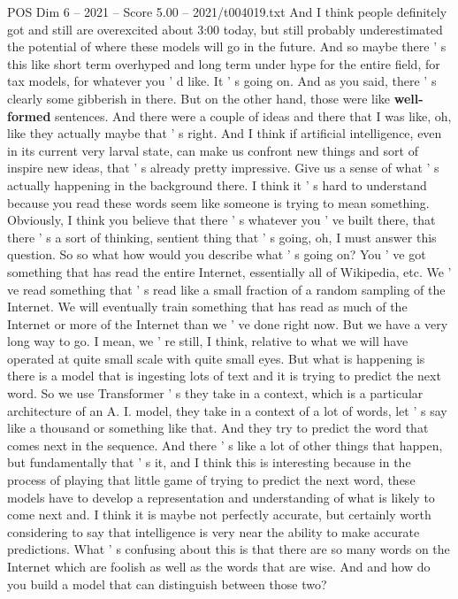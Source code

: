 \begin{textsample}{POS Dim 6 – 2021 – Score 5.00 – 2021/t004019.txt}
And I think people definitely got and still are overexcited about 3:00 today, but still probably underestimated the potential of where these models will go in the future.
And so maybe there ' s this like short term overhyped and long term under hype for the entire field, for tax models, for whatever you ' d like.
It ' s going on.
And as you said, there ' s clearly some gibberish in there.
But on the other hand, those were like \textbf{well-formed} sentences.
And there were a couple of ideas and there that I was like, oh, like they actually maybe that ' s right.
And I think if artificial intelligence, even in its current very larval state, can make us confront new things and sort of inspire new ideas, that ' s already pretty impressive.
Give us a sense of what ' s actually happening in the background there.
I think it ' s hard to understand because you read these words seem like someone is trying to mean something.
Obviously, I think you believe that there ' s whatever you ' ve built there, that there ' s a sort of thinking, sentient thing that ' s going, oh, I must answer this question.
So so what how would you describe what ' s going on?
You ' ve got something that has read the entire Internet, essentially all of Wikipedia, etc.
We ' ve read something that ' s read like a small fraction of a random sampling of the Internet.
We will eventually train something that has read as much of the Internet or more of the Internet than we ' ve done right now.
But we have a very long way to go.
I mean, we ' re still, I think, relative to what we will have operated at quite small scale with quite small eyes.
But what is happening is there is a model that is ingesting lots of text and it is trying to predict the next word.
So we use Transformer ' s they take in a context, which is a particular architecture of an A.
I. model, they take in a context of a lot of words, let ' s say like a thousand or something like that.
And they try to predict the word that comes next in the sequence.
And there ' s like a lot of other things that happen, but fundamentally that ' s it, and I think this is interesting because in the process of playing that little game of trying to predict the next word, these models have to develop a representation and understanding of what is likely to come next and.
I think it is maybe not perfectly accurate, but certainly worth considering to say that intelligence is very near the ability to make accurate predictions.
What ' s confusing about this is that there are so many words on the Internet which are foolish as well as the words that are wise.
And and how do you build a model that can distinguish between those two?

\end{textsample}
